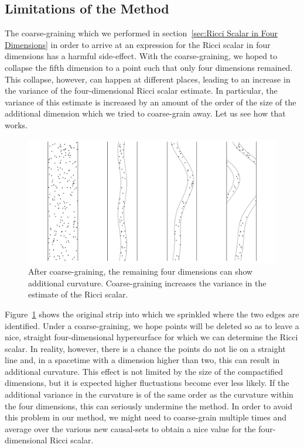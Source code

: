 \documentclass[a4paper,12pt]{article}
\numberwithin{equation}{section}
\begin{document}
\subsection{Limitations of the Method}
\label{sec:Limitations of the Method}

The coarse-graining which we performed in section~\ref{sec:Ricci Scalar in Four Dimensions} in order to arrive at an expression for the Ricci scalar in four dimensions has a harmful side-effect. With the coarse-graining, we hoped to collapse the fifth dimension to a point such that only four dimensions remained. This collapse, however, can happen at different places, leading to an increase in the variance of the four-dimensional Ricci scalar estimate. In particular, the variance of this estimate is increased by an amount of the order of the size of the additional dimension which we tried to coarse-grain away. Let us see how that works.

\begin{figure}[h]
\begin{center}
\leavevmode
\includegraphics[scale=.44]{Graph13.pdf}
\caption{After coarse-graining, the remaining four dimensions can show additional curvature. Coarse-graining increases the variance in the estimate of the Ricci scalar.}
\label{fig:Graph13}
\end{center}
\end{figure}

Figure~\ref{fig:Graph13} shows the original strip into which we sprinkled where the two edges are identified. Under a coarse-graining, we hope points will be deleted so as to leave a nice, straight four-dimensional hypersurface for which we can determine the Ricci scalar. In reality, however, there is a chance the points do not lie on a straight line and, in a spacetime with a dimension higher than two, this can result in additional curvature. This effect is not limited by the size of the compactified dimensions, but it is expected higher fluctuations become ever less likely. If the additional variance in the curvature is of the same order as the curvature within the four dimensions, this can seriously undermine the method. In order to avoid this problem in our method, we might need to coarse-grain multiple times and average over the various new causal-sets to obtain a nice value for the four-dimensional Ricci scalar.
\end{document}
